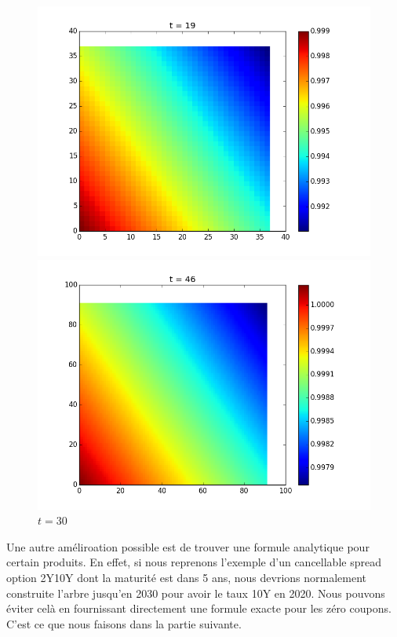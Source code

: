 \begin{figure}[H]
\begin{minipage}[b]{.46\linewidth}
  \caption{$t = 10$ \label{fig2}}
\end{minipage}
 \begin{minipage}[b]{.46\linewidth}
     \centering    \includegraphics[scale=0.2]{img/slices2d/sl_19.png}
  \caption{$t = 20$ \label{fig3}}
\end{minipage}
 \begin{minipage}[b]{.46\linewidth}
     \centering    \includegraphics[scale=0.2]{img/slices2d/sl_46.png}
  \caption{$t = 30$}
\end{minipage}

\end{figure}

Une autre améliroation possible est de trouver une formule analytique pour certain produits. En effet, si nous reprenons l'exemple d'un cancellable spread option 2Y10Y dont la maturité est dans 5 ans, nous devrions normalement construite l'arbre jusqu'en 2030 pour avoir le taux 10Y en 2020. Nous pouvons éviter celà en fournissant directement une formule exacte pour les zéro coupons. C'est ce que nous faisons dans la partie suivante.

